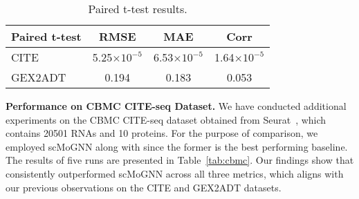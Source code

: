 \begin{table}[h]
\centering
\caption{Paired t-test results.}\label{tab:ttest}
\begin{tabular}{@{}lccc@{}}
\toprule
Paired t-test & \textbf{RMSE} & \textbf{MAE} & \textbf{Corr} \\ \midrule
CITE          & 5.25$\times 10^{-5}$          & 6.53$\times 10^{-5}$         & 1.64$\times 10^{-5}$          \\
GEX2ADT       & 0.194         & 0.183        & 0.053         \\ \bottomrule
\end{tabular}
\end{table}
\fi



\noindent \textbf{Performance on CBMC CITE-seq Dataset.}
\label{app:cbmc}
We have conducted additional experiments on the CBMC CITE-seq dataset obtained from Seurat~\cite{hao2021integrated}, which contains 20501 RNAs and 10 proteins. For the purpose of comparison, we employed scMoGNN along with \method{} since the former is the best performing baseline. The results of five runs are presented in Table~\ref{tab:cbmc}. Our findings show that \method{} consistently outperformed scMoGNN across all three metrics, which aligns with our previous observations on the CITE and GEX2ADT datasets.

\begin{table}[h]
\centering
\vspace{-0.5em}
\caption{Results on CBMC dataset.}\label{tab:cbmc}
\vspace{-1.2em}
\vspace{-1.8em}
\end{table}

